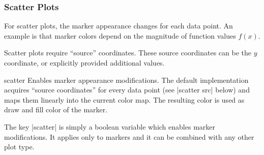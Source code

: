 \begin{codeexample}[width=4cm]
\table

\end{codeexample}

\subsubsection{Scatter Plots}
\label{pgfplots:scatter}
For scatter plots, the marker appearance changes for each data point. An example is that marker colors depend on the magnitude of function values $f(x)$.

Scatter plots require ``source'' coordinates. These source coordinates can be the $y$ coordinate, or explicitly provided additional values.

\begin{plottype}{scatter}
	Enables marker appearance modifications. The default implementation acquires ``source coordinates'' for every data point (see |scatter src| below) and maps them linearly into the current color map. The resulting color is used as draw and fill color of the marker.

\begin{codeexample}[]
\end{codeexample}

	The key |scatter| is simply a boolean variable which enables marker modifications. It applies only to markers and it can be combined with any other plot type.

\begin{codeexample}[]
\end{codeexample}
\end{plottype}

